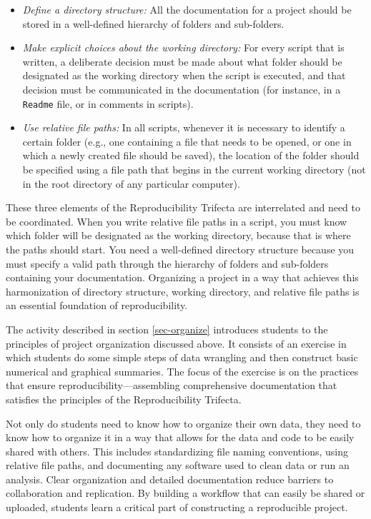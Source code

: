 \documentclass[
  12pt]{article}
\begin{document}
\begin{itemize}
    \item \textit{Define a directory structure: }All the documentation for a project should be stored in a well-defined hierarchy of folders and sub-folders.
    \item \textit{Make explicit choices about the working directory: }For every script that is written, a deliberate decision must be made about what folder should be designated as the working directory when the script is executed, and that decision must be communicated in the documentation (for instance, in a {\tt Readme} file, or in comments in scripts).
    \item \textit{Use relative file paths: }In all scripts, whenever it is necessary to identify a certain folder (e.g., one containing a file that needs to be opened, or one in which a newly created file should be saved), the location of the folder should be specified using a file path that begins in the current working directory (not in the root directory of any particular computer).
\end{itemize}

These three elements of the Reproducibility Trifecta are interrelated and need to be coordinated.
When you write relative file paths in a script, you must know which folder will be designated as the working directory, because that is where the paths should start.
You need a well-defined directory structure because you must specify a valid path through the hierarchy of folders and sub-folders containing your documentation.
Organizing a project in a way that achieves this harmonization of directory structure, working directory, and relative file paths is an essential foundation of reproducibility.

The activity described in section \ref{sec-organize} introduces students to the principles of project organization discussed above.
It consists of an exercise in which students do some simple steps of data wrangling and then construct basic numerical and graphical summaries.
The focus of the exercise is on the practices that ensure reproducibility---assembling comprehensive documentation that satisfies the principles of the Reproducibility Trifecta. 

Not only do students need to know how to organize their own data, they need to know how to organize it in a way that allows for the data and code to be easily shared with others.
This includes standardizing file naming conventions, using relative file paths, and documenting any software used to clean data or run an analysis.
Clear organization and detailed documentation reduce barriers to collaboration and replication.
By building a workflow that can easily be shared or uploaded, students learn a critical part of constructing a reproducible project.
\end{document}
